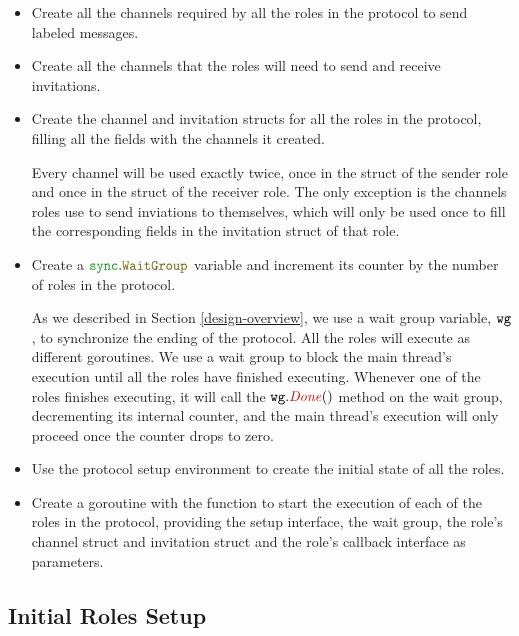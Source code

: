 \documentclass[12pt,twoside]{report}
\begin{document}
\begin{itemize}
    \item Create all the channels required by all the roles in the protocol to send labeled messages. 
    \item Create all the channels that the roles will need to send and receive invitations.
    \item Create the channel and invitation structs for all the roles in the protocol, filling all the fields with the channels it created. 
    
    Every channel will be used exactly twice, once in the struct of the sender role and once in the struct of the receiver role. The only exception is the channels roles use to send inviations to themselves, which will only be used once to fill the corresponding fields in the invitation struct of that role.
    \item Create a $\pkgstructaccess{sync}{WaitGroup}$ variable and increment its counter by the number of roles in the protocol.
    
    As we described in Section \ref{design-overview}, we use a wait group variable, ${\mathtt{wg}}$, to synchronize the ending of the protocol. All the roles will execute as different goroutines. We use a wait group to block the main thread's execution until all the roles have finished executing. Whenever one of the roles finishes executing, it will call the $\methodcall{wg}{Done}()$ method on the wait group, decrementing its internal counter, and the main thread's execution will only proceed once the counter drops to zero.

    \item Use the protocol setup environment to create the initial state of all the roles.

    \item Create a goroutine with the function to start the execution of each of the roles in the protocol, providing the setup interface, the wait group, the role's channel struct and invitation struct and the role's callback interface as parameters.
\end{itemize}

\subsection{Initial Roles Setup}
\end{document}
